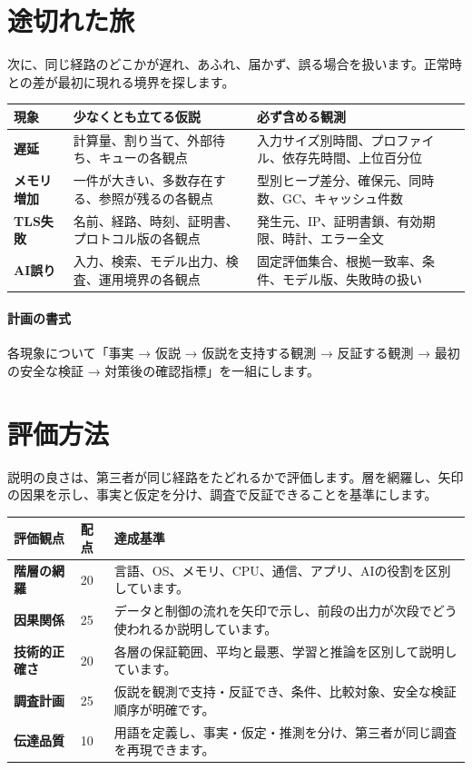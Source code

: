 \par
\endgroup


\section{途切れた旅}
\label{sec:07-practice-17}

次に、同じ経路のどこかが遅れ、あふれ、届かず、誤る場合を扱います。正常時との差が最初に現れる境界を探します。

\begingroup
  \noindent
  \begin{tabularx}{\textwidth}{@{}>{\bfseries}p{22mm}YY@{}}
    \toprule
    現象 & 少なくとも立てる仮説 & 必ず含める観測 \\
    \midrule
    遅延 & 計算量、割り当て、外部待ち、キューの各観点 & 入力サイズ別時間、プロファイル、依存先時間、上位百分位 \\
    メモリ増加 & 一件が大きい、多数存在する、参照が残るの各観点 & 型別ヒープ差分、確保元、同時数、GC、キャッシュ件数 \\
    TLS失敗 & 名前、経路、時刻、証明書、プロトコル版の各観点 & 発生元、IP、証明書鎖、有効期限、時計、エラー全文 \\
    AI誤り & 入力、検索、モデル出力、検査、運用境界の各観点 & 固定評価集合、根拠一致率、条件、モデル版、失敗時の扱い \\
    \bottomrule
  \end{tabularx}
  \vspace{4mm}
\paragraph{計画の書式}
    各現象について「事実 → 仮説 → 仮説を支持する観測 → 反証する観測 → 最初の安全な検証 → 対策後の確認指標」を一組にします。

\par
\endgroup


\section{評価方法}
\label{sec:07-practice-18}

説明の良さは、第三者が同じ経路をたどれるかで評価します。層を網羅し、矢印の因果を示し、事実と仮定を分け、調査で反証できることを基準にします。

\begingroup
  \noindent
  \begin{tabularx}{\textwidth}{@{}>{\bfseries}p{25mm}p{14mm}Y@{}}
    \toprule
    評価観点 & 配点 & 達成基準 \\
    \midrule
    階層の網羅 & 20 & 言語、OS、メモリ、CPU、通信、アプリ、AIの役割を区別しています。 \\
    因果関係 & 25 & データと制御の流れを矢印で示し、前段の出力が次段でどう使われるか説明しています。 \\
    技術的正確さ & 20 & 各層の保証範囲、平均と最悪、学習と推論を区別して説明しています。 \\
    調査計画 & 25 & 仮説を観測で支持・反証でき、条件、比較対象、安全な検証順序が明確です。 \\
    伝達品質 & 10 & 用語を定義し、事実・仮定・推測を分け、第三者が同じ調査を再現できます。 \\
    \bottomrule
  \end{tabularx}
  \vspace{1mm}
